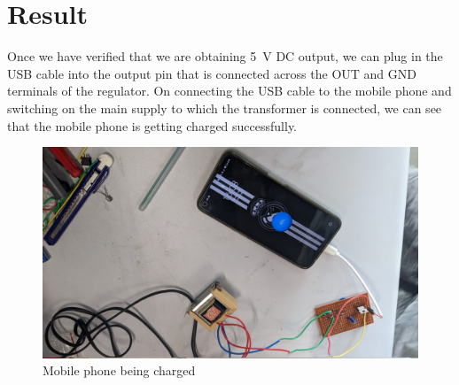 \documentclass[journal,12pt,twocolumn]{IEEEtran}
\numberwithin{equation}{section}
\numberwithin{figure}{section}
\begin{document}
	\section{Result}	
	Once we have verified that we are obtaining \SI{5}{\volt} DC output, we can plug in the USB cable into the output pin that is connected across the OUT and GND terminals of the regulator. On connecting the USB cable to the mobile phone and switching on the main supply to which the transformer is connected, we can see that the mobile phone is getting charged successfully.
	\begin{figure}[!ht]
		\centering
		\includegraphics[width=\columnwidth]{./figs/charging.jpg}
		\caption{Mobile phone being charged}
		\label{fig-charging}	
	\end{figure}
	
	
	
\end{document}
